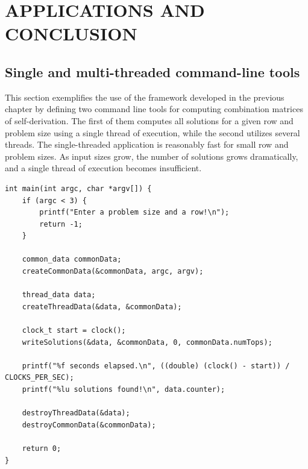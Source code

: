 \chapter{APPLICATIONS AND CONCLUSION}


\section{Single and multi-threaded command-line tools}

This section exemplifies the use of the framework developed in the previous chapter by defining two command line tools for computing combination matrices of self-derivation. The first of them computes all solutions for a given row and problem size using a single thread of execution, while the second utilizes several threads. The single-threaded application is reasonably fast for small row and problem sizes. As input sizes grow, the number of solutions grows dramatically, and a single thread of execution becomes insufficient.

\begin{lstlisting}[caption={A single-threaded command line tool.},label={singleMain}]
int main(int argc, char *argv[]) {
    if (argc < 3) {
        printf("Enter a problem size and a row!\n");
        return -1;
    }

    common_data commonData;
    createCommonData(&commonData, argc, argv);

    thread_data data;
    createThreadData(&data, &commonData);

    clock_t start = clock();
    writeSolutions(&data, &commonData, 0, commonData.numTops);

    printf("%f seconds elapsed.\n", ((double) (clock() - start)) / CLOCKS_PER_SEC);
    printf("%lu solutions found!\n", data.counter);

    destroyThreadData(&data);
    destroyCommonData(&commonData);

    return 0;
}
\end{lstlisting}

